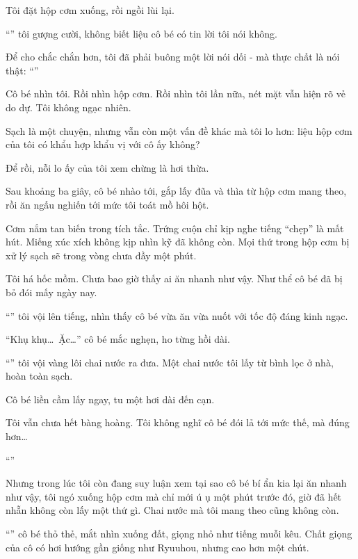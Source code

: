 \documentclass[../main.tex]{subfiles}
\begin{document}
Tôi đặt hộp cơm xuống, rồi ngồi lùi lại.

``'' tôi gượng cười, không biết liệu cô bé có tin lời tôi nói không.

Để cho chắc chắn hơn, tôi đã phải buông một lời nói dối - mà thực chất là nói thật: ``''

Cô bé nhìn tôi. Rồi nhìn hộp cơm. Rồi nhìn tôi lần nữa, nét mặt vẫn hiện rõ vẻ do dự. Tôi không ngạc nhiên.

Sạch là một chuyện, nhưng vẫn còn một vấn đề khác mà tôi lo hơn: liệu hộp cơm của tôi có khẩu hợp khẩu vị với cô ấy không?

Để rồi, nỗi lo ấy của tôi xem chừng là hơi thừa.

Sau khoảng ba giây, cô bé nhào tới, gắp lấy đũa và thìa từ hộp cơm mang theo, rồi ăn ngấu nghiến tới mức tôi toát mồ hôi hột.

Cơm nắm tan biến trong tích tắc. Trứng cuộn chỉ kịp nghe tiếng ``chẹp'' là mất hút. Miếng xúc xích không kịp nhìn kỹ đã không còn. Mọi thứ trong hộp cơm bị xử lý sạch sẽ trong vòng chưa đầy một phút.

Tôi há hốc mồm. Chưa bao giờ thấy ai ăn nhanh như vậy. Như thể cô bé đã bị bỏ đói mấy ngày nay.

``'' tôi vội lên tiếng, nhìn thấy cô bé vừa ăn vừa nuốt với tốc độ đáng kinh ngạc.

``Khụ khụ\dots\ Ặc\dots'' cô bé mắc nghẹn, ho từng hồi dài.

``'' tôi vội vàng lôi chai nước ra đưa. Một chai nước tôi lấy từ bình lọc ở nhà, hoàn toàn sạch.

Cô bé liền cầm lấy ngay, tu một hơi dài đến cạn.

Tôi vẫn chưa hết bàng hoàng. Tôi không nghĩ cô bé đói lả tới mức thế, mà đúng hơn\dots

``''

Nhưng trong lúc tôi còn đang suy luận xem tại sao cô bé bí ẩn kia lại ăn nhanh như vậy, tôi ngó xuống hộp cơm mà chỉ mới ú ụ một phút trước đó, giờ đã hết nhẵn không còn lấy một thứ gì. Chai nước mà tôi mang theo cũng không còn.

``'' cô bé thỏ thẻ, mắt nhìn xuống đất, giọng nhỏ như tiếng muỗi kêu. Chất giọng của cô có hơi hướng gần giống như Ryuuhou, nhưng cao hơn một chút.
\end{document}
